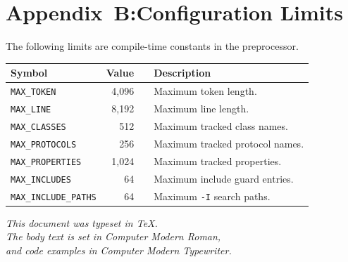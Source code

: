 \documentclass[11pt,twoside]{article}
\begin{document}
\section*{Appendix~B:\quad Configuration Limits}

The following limits are compile-time constants in the preprocessor.

\bigskip
\noindent
\begin{tabularx}{\textwidth}{lrlX}
\hline
\bf Symbol & \bf Value & & \bf Description \\
\hline
{\tt MAX\_TOKEN}       & 4{,}096 & & Maximum token length. \\
{\tt MAX\_LINE}        & 8{,}192 & & Maximum line length. \\
{\tt MAX\_CLASSES}     & 512     & & Maximum tracked class names. \\
{\tt MAX\_PROTOCOLS}   & 256     & & Maximum tracked protocol names. \\
{\tt MAX\_PROPERTIES}  & 1{,}024 & & Maximum tracked properties. \\
{\tt MAX\_INCLUDES}    & 64      & & Maximum include guard entries. \\
{\tt MAX\_INCLUDE\_PATHS} & 64  & & Maximum {\tt -I} search paths. \\
\hline
\end{tabularx}

\vfill


\begin{center}
\small\itshape
This document was typeset in \TeX.\\
The body text is set in Computer Modern Roman,\\
and code examples in Computer Modern Typewriter.
\end{center}
\end{document}
